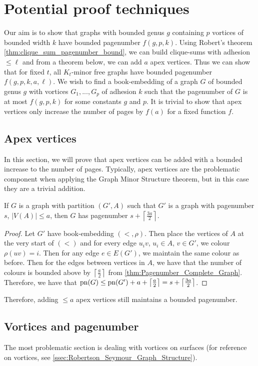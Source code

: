 
\chapter{Potential proof techniques}\label{chap:Proving_The_Theorem}
Our aim is to show that graphs with bounded genus $g$ containing $p$ vortices of bounded width $k$ have bounded pagenumber $f(g, p, k)$.
Using Robert's theorem \cref{thm:clique_sum_pagenumber_bound}, we can build clique-sums with adhesion $\leq \ell$ and from a theorem below, we can add $a$ apex vertices. 
Thus we can show that for fixed $t$, all $K_t$-minor free graphs have bounded pagenumber $f(g, p, k, a, \ell)$. 
We wish to find a book-embedding of a graph $G$ of bounded genus $g$ with vortices $G_1, ..., G_p$ of adhesion $k$ such that the pagenumber of $G$ is at most $f(g, p, k)$ for some constants $g$ and $p$. It is trivial to show that apex vertices only increase the number of pages by $f(a)$ for a fixed function $f$. 
\section{Apex vertices}
In this section, we will prove that apex vertices can be added with a bounded increase to the number of pages. Typically, apex vertices are the problematic component when applying the Graph Minor Structure theorem, but in this case they are a trivial addition.
\begin{theorem}
	If $G$ is a graph with partition $(G', A)$ such that $G'$ is a graph with pagenumber $s$, $|V(A)| \leq a$, then $G$ has pagenumber $s + \left\lceil \frac{3a}{2}\right\rceil$. 
\end{theorem}
\begin{proof}
	Let $G'$ have book-embedding $(<, \rho)$. Then place the vertices of $A$ at the very start of $(<)$ and for every edge $u_iv$, $u_i \in A$, $v \in G'$, we colour $\rho(uv) = i$. Then for any edge $e \in E(G')$, we maintain the same colour as before. Then for the edges between vertices in $A$, we have that the number of colours is bounded above by $\left\lceil \frac{a}{2} \right\rceil$ from \cref{thm:Pagenumber_Complete_Graph}. Therefore, we have that $\text{pn}(G) \leq \text{pn}(G') + a + \left\lceil \frac{a}{2} \right\rceil =s + \left\lceil \frac{3a}{2}\right\rceil$. 
\end{proof}

Therefore, adding $ \leq a$ apex vertices still maintains a bounded pagenumber.

\section{Vortices and pagenumber}
The most problematic section is dealing with vortices on surfaces (for reference on vortices, see \cref{ssec:Robertson_Seymour_Graph_Structure}).

